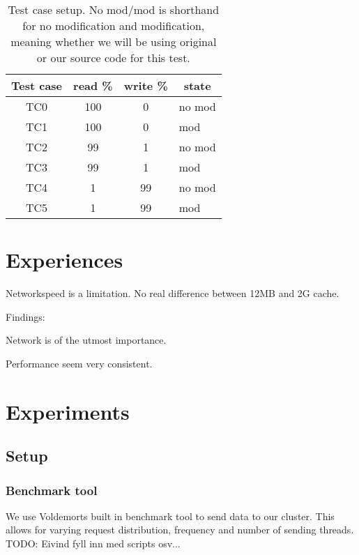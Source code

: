 \begin{center}
\begin{table}[h]
	\begin{tabular}{|c|c|c|l|}
		\multicolumn{1}{c}{Test case} & 
		\multicolumn{1}{c}{read \%} & 
		\multicolumn{1}{c}{write \%} & 
		\multicolumn{1}{c}{state} \\
		\hline

		TC0 & 100 & 0 & no mod \\
		TC1 & 100 & 0 & mod \\
		TC2 & 99 & 1 & no mod \\
		TC3 & 99 & 1 & mod \\
		TC4 & 1 & 99 & no mod \\
		TC5 & 1 & 99 & mod \\

		\hline
	\end{tabular}
	\caption{Test case setup. No mod/mod is shorthand for no modification and modification, meaning whether we will be using original or our source code for this test.}
	\label{tbl:testcases}
\end{table}
\end{center}

\section{Experiences}
Networkspeed is a limitation. 
No real difference between 12MB and 2G cache. 


Findings:

Network is of the utmost importance.

Performance seem very consistent.





\section{Experiments}
\subsection{Setup}
\subsubsection{Benchmark tool}
We use Voldemorts built in benchmark tool to send data to our cluster. This allows for varying request distribution, frequency and number of sending threads. TODO: Eivind fyll inn med scripts osv... 

